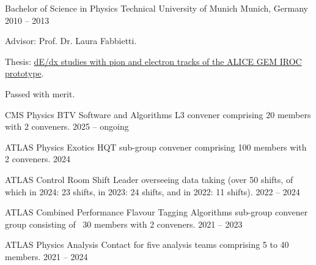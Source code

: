\documentclass[11pt, letterpaper, draft]{academic-cv}
\begin{document}
\begin{cventries}
	\cventry
	  {Bachelor of Science in Physics} %
	  {Technical University of Munich} %
	  {Munich, Germany} %
	  {2010 -- 2013} %
	  {
		\begin{cvitems} %
		  \item {Advisor: Prof. Dr. Laura Fabbietti.}
		  \item {Thesis: \href{https://www.das.ktas.ph.tum.de/DasDocs/Public/Bachelor_Theses/thesis_Gadow.pdf}{dE/dx studies with pion and electron tracks of the ALICE GEM IROC prototype}.}
		  \item {Passed with merit.}
		\end{cvitems}
	  }
  \end{cventries}
  



\begin{cvhonors}
  \cvhonor
    {CMS Physics BTV Software and Algorithms L3 convener} %
    {comprising 20 members with 2 conveners.} %
    {} %
    {2025 -- ongoing} %

  \cvhonor
    {ATLAS Physics Exotics HQT sub-group convener} %
    {comprising 100 members with 2 conveners.} %
    {} %
    {2024} %

  \cvhonor
    {ATLAS Control Room Shift Leader} %
    {overseeing data taking (over 50 shifts, of which in 2024: 23 shifts, in 2023: 24 shifts, and in 2022: 11 shifts).} %
    {} %
    {2022 -- 2024} %

  \cvhonor
    {ATLAS Combined Performance Flavour Tagging Algorithms
    sub-group convener} %
    {group consisting of ~30 members with 2 conveners.} %
    {} %
    {2021 -- 2023} %

  \cvhonor
    {ATLAS Physics Analysis Contact} %
    {for five analysis teams comprising 5 to 40 members.} %
    {} %
    {2021 -- 2024} %

\end{cvhonors}
\end{document}
